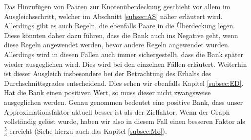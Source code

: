 \documentclass[12pt,onecolumn, notitlepage]{scrartcl}
\begin{document}
Das Hinzufügen von Paaren zur Knotenüberdeckung geschieht vor allem im Ausgleichsschritt, welcher im  Abschnitt \ref{subsec:AS} näher erläutert wird. Allerdings gibt es auch Regeln, die ebenfalls Paare in die Überdeckung legen. Diese könnten daher dazu führen, dass die Bank auch ins Negative geht, wenn diese Regeln angewendet werden, bevor andere Regeln angewendet wurden. Allerdings wird in diesen Fällen auch immer sichergestellt, dass die Bank später wieder ausgeglichen wird. Dies wird bei den einzelnen Fällen erläutert. Weiterhin ist dieser Ausgleich insbesondere bei der Betrachtung des Erhalts des Durchschnittsgrades entscheidend. Dies sehen wir ebenfalls Kapitel \ref{subsec:ED}.\newline
Hat die Bank einen positiven Wert, so muss dieser nicht zwangsweise ausgeglichen werden. Genau genommen bedeutet eine positive Bank, dass unser Approximationsfaktor aktuell besser ist als der Zielfaktor. Wenn der Graph vollständig gelöst wurde, haben wir also in diesem Fall einen besseren Faktor als $\frac{5}{3}$ erreicht (Siehe hierzu auch das Kapitel \ref{subsec:Mo}). \newline\newline                                                                                                                                                                                                                                                                                   
\end{document}
